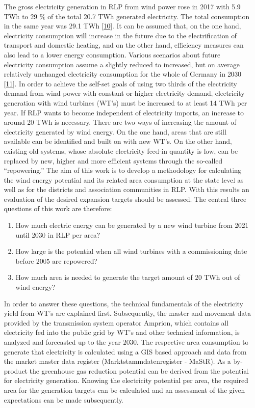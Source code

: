 \documentclass[a4paper,11pt]{article}
\begin{document}
The gross electricity generation in RLP from wind power rose in 2017 with 5.9 TWh to 29 \% of the total 20.7 TWh generated electricity. The total consumption in the same year was 29.1 TWh {[}\protect\hyperlink{ref-Lehnert.2020}{10}{]}. It can be assumed that, on the one hand, electricity consumption will increase in the future due to the electrification of transport and domestic heating, and on the other hand, efficiency measures can also lead to a lower energy consumption. Various scenarios about future electricity consumption assume a slightly reduced to increased, but on average relatively unchanged electricity consumption for the whole of Germany in 2030 {[}\protect\hyperlink{ref-NormanGerhardt.2015}{11}{]}. In order to achieve the self-set goals of using two thirds of the electricity demand from wind power with constant or higher electricity demand, electricity generation with wind turbines (WT's) must be increased to at least 14 TWh per year. If RLP wants to become independent of electricity imports, an increase to around 20 TWh is necessary. There are two ways of increasing the amount of electricity generated by wind energy. On the one hand, areas that are still available can be identified and built on with new WT's. On the other hand, existing old systems, whose absolute electricity feed-in quantity is low, can be replaced by new, higher and more efficient systems through the so-called ``repowering.''
The aim of this work is to develop a methodology for calculating the wind energy potential and its related area consumption at the state level as well as for the districts and association communities in RLP. With this results an evaluation of the desired expansion targets should be assessed. The central three questions of this work are therefore:
\begin{enumerate}
\def\labelenumi{\arabic{enumi}.}
\item
  How much electric energy can be generated by a new wind turbine from 2021 until 2030 in RLP per area?
\item
  How large is the potential when all wind turbines with a commissioning date before 2005 are repowered?
\item
  How much area is needed to generate the target amount of 20 TWh out of wind energy?
\end{enumerate}
In order to answer these questions, the technical fundamentals of the electricity yield from WT's are explained first. Subsequently, the master and movement data provided by the transmission system operator Amprion, which contains all electricity fed into the public grid by WT's and other technical information, is analyzed and forecasted up to the year 2030. The respective area consumption to generate that electricity is calculated using a GIS based approach and data from the market master data register (Marktstammdatenregister - MaStR). As a by-product the greenhouse gas reduction potential can be derived from the potential for electricity generation. Knowing the electricity potential per area, the required area for the generation targets can be calculated and an assessment of the given expectations can be made subsequently.
\end{document}
